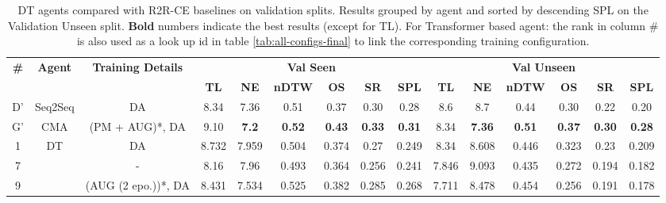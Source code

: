 \begin{table}
\centering
\caption{\label{tab:dt_final}DT agents compared with R2R-CE baselines on validation splits. Results grouped by agent and sorted by descending SPL on the Validation Unseen split. \textbf{Bold} numbers indicate the best results (except for TL). For Transformer based agent:  the rank in column \# is also used as a look up id in table \ref{tab:all-configs-final} to link the corresponding training configuration.}
\begin{tabular}{@{\hskip3pt}c@{\hskip3pt}c@{\hskip3pt}c@{\hskip3pt}c@{\hskip3pt}c@{\hskip3pt}c@{\hskip3pt}c@{\hskip3pt}c@{\hskip3pt}c@{\hskip3pt}c@{\hskip3pt}c@{\hskip3pt}c@{\hskip3pt}c@{\hskip3pt}c@{\hskip3pt}c}
\toprule
\textbf{\#} & \textbf{Agent} & \textbf{Training Details} & \multicolumn{6}{c}{\textbf{Val Seen}} & \multicolumn{6}{c}{\textbf{Val Unseen}} \\
  \cmidrule(l){4-9}\cmidrule(l){10-15}\textbf{~} &     \textbf{~} &                \textbf{~} &       \textbf{TL} &     \textbf{NE} &   \textbf{nDTW} &     \textbf{OS} &     \textbf{SR} &    \textbf{SPL} &         \textbf{TL} &     \textbf{NE} &   \textbf{nDTW} &     \textbf{OS} &    \textbf{SR} &    \textbf{SPL} \\
\midrule
          D' & Seq2Seq & DA & 8.34 & 7.36 & 0.51 & 0.37 & 0.30 & 0.28 & 8.6 & 8.7 & 0.44 & 0.30 & 0.22 & 0.20 \\
          \midrule
          G' & CMA & (PM + AUG)*, DA  & 9.10 & \textbf{7.2} & \textbf{0.52} & \textbf{0.43} & \textbf{0.33} & \textbf{0.31} & 8.34 & \textbf{7.36} & \textbf{0.51} & \textbf{0.37} & \textbf{0.30} & \textbf{0.28} \\
          \midrule
          1 &             DT &                  DA &             8.732 &           7.959 &           0.504 &           0.374 &            0.27 &           0.249 &                8.34 &           8.608 &           0.446 &  0.323 &  0.23 &  0.209 \\
          7 &              &                    - &              8.16 &            7.96 &           0.493 &           0.364 &           0.256 &           0.241 &               7.846 &           9.093 &           0.435 &           0.272 &          0.194 &           0.182 \\
          9 &              &  (AUG (2 epo.))*, DA &             8.431 &  7.534 &  0.525 &  0.382 &  0.285 &  0.268 &               7.711 &  8.478 &  0.454 &           0.256 &          0.191 &           0.178 \\
\bottomrule
\end{tabular}
\end{table}
